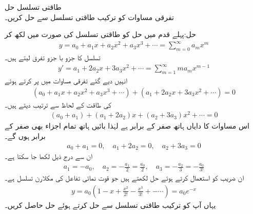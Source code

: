 \quad طاقتی تسلسل حل \\
تفرقی مساوات  کو ترکیب طاقتی تسلسل سے حل کریں۔

حل:پہلے قدم میں حل کو طاقتی تسلسل کی صورت میں لکھ کر
\begin{align}\label{مساوات_بیسل_طاقتی_تسلسل_حل_الف}
y=a_0+a_1x+a_2x^2+a_3x^3+\cdots=\sum_{m=0}^{\infty} a_m x^m
\end{align}
تسلسل کا جزو با جزو تفرق لیتے ہیں۔
\begin{align}\label{مساوات_بیسل_طاقتی_تسلسل_حل_ب}
y'=a_1+2a_2x+3a_3x^2+\cdots=\sum_{m=1}^{\infty} ma_mx^{m-1}
\end{align}
انہیں دیے گئے تفرقی مساوات میں پر کرتے ہوئے
\begin{align*}
(a_0+a_1x+a_2x^2+a_3x^3+\cdots)+(a_1+2a_2x+3a_3x^2+\cdots)=0
\end{align*}
 کی طاقت کے لحاظ سے ترتیب دیتے ہیں۔
\begin{align*}
(a_0+a_1)+(a_1+2a_2)x+(a_2+3a_3)x^2+\cdots=0
\end{align*}
اس مساوات کا دایاں ہاتھ صفر کے برابر ہے لہٰذا بائیں ہاتھ تمام اجزاء بھی صفر کے برابر ہوں گے۔
\begin{align*}
a_0+a_1=0,\quad a_1+2a_2=0, \quad a_2+3a_3=0
\end{align*}
ان سے درج ذیل لکھا جا سکتا ہے۔
\begin{align*}
a_1=-a_0,\quad a_2=-\frac{a_1}{2}=\frac{a_0}{2},\quad a_3=-\frac{a_2}{3}=-\frac{a_0}{3!}
\end{align*}
ان  ضریب  کو استعمال کرتے ہوئے  حل  لکھتے ہیں جو قوت نمائی تفاعل  کی مکلارن تسلسل ہے۔
\begin{align*}
y=a_0(1-x+\frac{x^2}{2!}-\frac{x^3}{3!}+-\cdots)=a_0 e^{-x}
\end{align*}
یہاں آپ   کو ترکیب طاقتی تسلسل سے حل کرتے ہوئے حل  حاصل کریں۔

